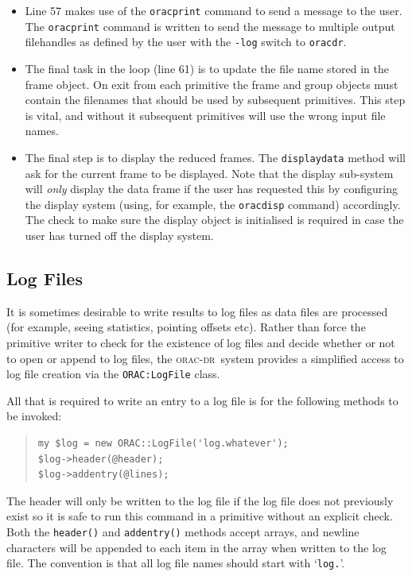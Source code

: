 \documentclass[twoside,11pt]{article}
\renewcommand{\_}{\texttt{\symbol{95}}}
\newcommand{\Oracdr}{\textsc{orac-dr}}
\newcommand{\oracdr}{\texttt{oracdr}}
\newenvironment{myquote}{\begin{quote}\begin{small}}{\end{small}\end{quote}}
\begin{document}
\begin{itemize}
\item Line 57 makes use of the \texttt{orac\_print} command to send a
message to the user. The \texttt{orac\_print} command is written to
send the message to multiple output filehandles as defined by the user 
with the \texttt{-log} switch to \oracdr.

\item The final task in the loop (line 61) is to update the file name
  stored in the frame object. On exit from each primitive the frame
  and group objects must contain the filenames that should be used by
  subsequent primitives. This step is vital, and without it subsequent
  primitives will use the wrong input file names.

\item The final step is to display the reduced frames. The
\texttt{display\_data} method will ask for the current frame to be
displayed. Note that the display sub-system will \emph{only} display
the data frame if the user has requested this by configuring the
display system (using, for example, the \texttt{oracdisp} command)
accordingly. The check to make sure the display object is initialised
is required in case the user has turned off the display system.

\end{itemize}

\subsection{Log Files\label{logfiles}}

It is sometimes desirable to write results to log files as data
files are processed (for example, seeing statistics, pointing offsets
etc). Rather than force the primitive writer to check for the
existence of log files and decide whether or not to open or append to
log files, the \Oracdr\ system provides a simplified access to log
file creation via the \texttt{ORAC:LogFile} class.

All that is required to write an entry to a log file is for the
following methods to be invoked:
\begin{myquote}
\begin{verbatim}
my $log = new ORAC::LogFile('log.whatever');
$log->header(@header);
$log->addentry(@lines);
\end{verbatim}
\end{myquote} %
The header will only be written to the log file if the log file
does not previously exist so it is safe to run this command in a
primitive without an explicit check. Both the \texttt{header()} and
\texttt{addentry()} methods accept arrays, and newline characters will
be appended to each item in the array when written to the log file.
The convention is that all log file names should start with `\texttt{log.}'.
\end{document}
